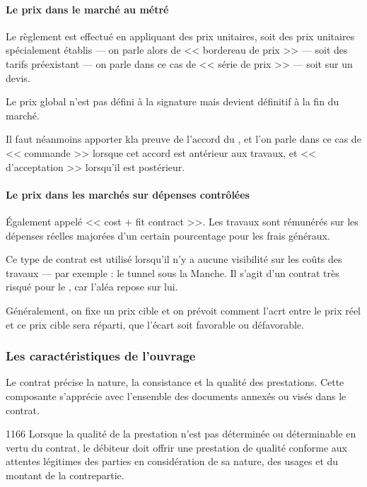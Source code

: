 				\paragraph{Le prix dans le marché au métré\\}

				Le règlement est effectué en appliquant des prix unitaires, soit des prix unitaires spécialement établis --- on parle alors de << bordereau de prix >> --- soit des tarifs préexistant --- on parle dans ce cas de << série de prix >> --- soit sur un devis.

				Le prix global n'est pas défini à la signature mais devient définitif à la fin du marché.

				Il faut néanmoins apporter kla preuve de l'accord du \Mo, et l'on parle dans ce cas de << commande >> lorsque cet accord est antérieur aux travaux, et << d'acceptation >> lorsqu'il est postérieur.

				\paragraph{Le prix dans les marchés sur dépenses contrôlées\\}

				Également appelé << cost + fit contract >>. Les travaux sont rémunérés sur les dépenses réelles majorées d'un certain pourcentage pour les frais généraux.

				Ce type de contrat est utilisé lorsqu'il n'y a aucune visibilité sur les coûts des travaux --- par exemple : le tunnel sous la Manche. Il s'agit d'un contrat très risqué pour le \Mo, car l'aléa repose sur lui.

				Généralement, on fixe un prix cible et on prévoit comment l'acrt entre le prix réel et ce prix cible sera réparti, que l'écart soit favorable ou défavorable.

			\subsubsection{Les caractéristiques de l'ouvrage}

				Le contrat précise la nature, la consistance et la qualité des prestations. Cette composante s'apprécie avec l'ensemble des documents annexés ou visés dans le contrat.

				\begin{citationArticleCciv}{1166}
					Lorsque la qualité de la prestation n'est pas déterminée ou déterminable en vertu du contrat, le débiteur doit offrir une prestation de qualité conforme aux attentes légitimes des parties en considération de sa nature, des usages et du montant de la contrepartie.
				\end{citationArticleCciv}

